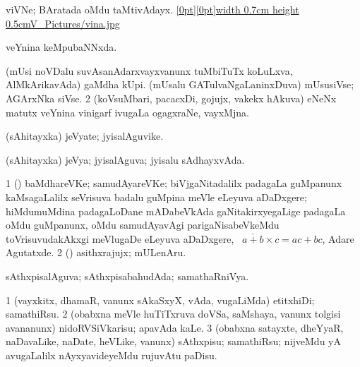 {{{{{{\bentry
{} 
\gl{\nA}
\bmng
 viVNe; BAratada oMdu taMtivAdayx. \quad \hyperlink{vinafigure}{\raisebox{-0.15cm}[0pt][0pt]{\pdfimage width 0.7cm height 0.5cm{V_Pictures/vina.jpg}}} 
\emng
\eentry

\bentry
{} 
\gl{\gu}
\expl{}
\bmng
 veYnina keMpubaNNxda. 
\emng
\eentry

\bentry
{} 
\gl{\nA}
\expl{}
\bmng
\bnum
{} 
\banum
{} (mUsi noVDalu suvAsanAdarxvayxvanunx tuMbiTuTx koLuLxva, AlMkArikavAda) gaMdha kUpi. 
 (mUsalu GATulvaNgaLaninxDuva) mUsusiVse; AGArxNka siVse. 
\hypertarget{vinaigrette(2)}{} 
\eanum
\numie
\num{2} (koVsuMbari, pacacxDi, gojujx, \mo vakekx hAkuva) eNeNx matutx veYnina vinigarf ivugaLa ogagxraNe, vayxMjna. 
\enum
\emng
\eentry

\bentry
{}
\gl{\nA}
\expl{}
\bmng
\emng
\eentry

\bentry
{} 
\gl{\nA}
\expl{}
\bmng
 (sAhitayxka) jeVyate; jyisalAguvike. 
\emng
\eentry

\bentry
{} 
\gl{\gu}
\expl{}
\bmng
 (sAhitayxka) jeVya; jyisalAguva; jyisalu sAdhayxvAda. 
\emng
\eentry

\bentry
{} 
\gl{\nA}
\bmng
\bnum
\num{1} (\biVga) baMdhareVKe; samudAyareVKe; biVjgaNitadalilx padagaLa guMpanunx kaMsagaLalilx seVrisuva badalu guMpina meVle eLeyuva aDaDxgere; hiMdumuMdina padagaLoDane mADabeVkAda gaNitakirxyegaLige padagaLa oMdu guMpanunx, oMdu samudAyavAgi parigaNisabeVkeMdu toVrisuvudakAkxgi meVlugaDe eLeyuva aDaDxgere, \udA\ $\overline{a+b} \times c=ac+bc$, Adare  Agutatxde. 
\num{2} (\aMrashA) asithxrajujx; mULenAru. 
\enum
\emng
\eentry

\bentry
{} 
\gl{\gu}
\expl{}
\bmng
 sAthxpisalAguva; sAthxpisabahudAda; samathaRniVya. 
\emng
\eentry

\bentry
{} 
\gl{\sakirx}
\expl{}
\bmng
\bnum
\num{1} (vayxkitx, dhamaR, \mo vanunx sAkaSxyX, vAda, \mo vugaLiMda) etitxhiDi; samathiRsu. 
\num{2} (obabxna meVle huTiTxruva doVSa, saMshaya, \mo vanunx tolgisi avananunx) nidoRVSiVkarisu; apavAda kaLe. 
\num{3} (obabxna satayxte, dheYyaR, naDavaLike, naDate, heVLike, \mo vanunx) sAthxpisu; samathiRsu; nijveMdu yA avugaLalilx nAyxyavideyeMdu rujuvAtu paDisu. 
\enum
\emng
\eentry

}}}}}}
